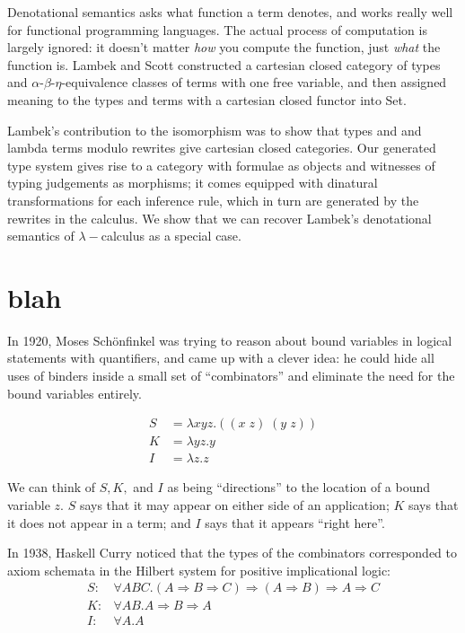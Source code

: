 \documentclass[a4paper,UKenglish]{article}
\newcommand{\maps}{\colon}
\begin{document}
Denotational semantics asks what function a term denotes, and works really well for functional programming languages.  The actual process of computation is largely ignored: it doesn't matter {\em how} you compute the function, just {\em what} the function is.  Lambek and Scott \cite{LambekScott} constructed a cartesian closed category of types and $\alpha$-$\beta$-$\eta$-equivalence classes of terms with one free variable, and then assigned meaning to the types and terms with a cartesian closed functor into Set.

Lambek's contribution to the isomorphism was to show that types and and lambda terms modulo rewrites give cartesian closed categories.  Our generated type system gives rise to a category with formulae as objects and witnesses of typing judgements as morphisms; it comes equipped with dinatural transformations for each inference rule, which in turn are generated by the rewrites in the calculus.  We show that we can recover Lambek's denotational semantics of $\lambda-$calculus as a special case.

\section {blah}

In 1920, Moses Sch\"onfinkel was trying to reason about bound variables in logical statements with quantifiers, and came up with a clever idea: he could hide all uses of binders inside a small set of ``combinators'' and eliminate the need for the bound variables entirely.

\[\begin{array}{rl}
  S &=\lambda xyz.((x\; z)\; (y\; z))\\
  K &=\lambda yz.y\\
  I &=\lambda z.z
\end{array}\]

We can think of $S,K,$ and $I$ as being ``directions'' to the location of a bound variable $z.$  $S$ says that it may appear on either side of an application; $K$ says that it does not appear in a term; and $I$ says that it appears ``right here''.

In 1938, Haskell Curry noticed that the types of the combinators corresponded to axiom schemata in the Hilbert system for positive implicational logic:
\[\begin{array}{rl}
  S\maps &\forall ABC.(A\Rightarrow B\Rightarrow C)\Rightarrow (A \Rightarrow B) \Rightarrow A \Rightarrow C\\
  K\maps &\forall AB.A \Rightarrow B \Rightarrow A\\
  I\maps &\forall A.A
\end{array}\]
\end{document}
